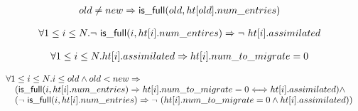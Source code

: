 \begin{lemma}
  \begin{equation*}
\begin{array}{l}        
  old \neq new \Rightarrow \mathsf{is\_full}(old, \mbox{$ht[old]$}.num\_entries)
\end{array}
  \end{equation*}  
  \label{old_is_full}
\end{lemma}  

\begin{lemma}
  \begin{equation*}
\begin{array}{l}      
  \forall 1 \leq i \leq N. \mbox{$\neg\ \mathsf{is\_full}(i,\mbox{$ht[i]$}.num\_entires)$} \Rightarrow \mbox{$\neg\ \mbox{$ht[i]$}.assimilated$}
  \end{array}
\end{equation*}
  \label{not_full_cannot_be_assimilated}  
\end{lemma}  

\begin{lemma}
  \begin{equation*}
\begin{array}{l}        
  \forall 1 \leq i \leq N. \mbox{$ht[i]$}.assimilated \Rightarrow \mbox{$ht[i]$}.num\_to\_migrate = 0
\end{array}
\end{equation*}
  \label{assimilated_nothing_to_migrate}  
\end{lemma}  

\begin{lemma}
  \begin{equation*}
    \begin{array}{l}
    \forall 1 \leq i \leq N. i \leq old \wedge old < new \Rightarrow  \\
    \quad (\mathsf{is\_full}(i, \mbox{$ht[i]$}.num\_entries) \Rightarrow \mbox{$ht[i]$}.num\_to\_migrate = 0 \Longleftrightarrow \mbox{$ht[i]$}.assimilated) \wedge \\
    \quad (\mbox{$\neg\ \mathsf{is\_full}(i, \mbox{$ht[i]$}.num\_entries)$} \Rightarrow \mbox{$\neg\ (\mbox{$ht[i]$}.num\_to\_migrate = 0 \wedge \mbox{$ht[i]$}.assimilated)$})
    \end{array}
  \end{equation*}
  \label{num_to_migrate_and_assimilated_in_old_tables}  
\end{lemma}  

